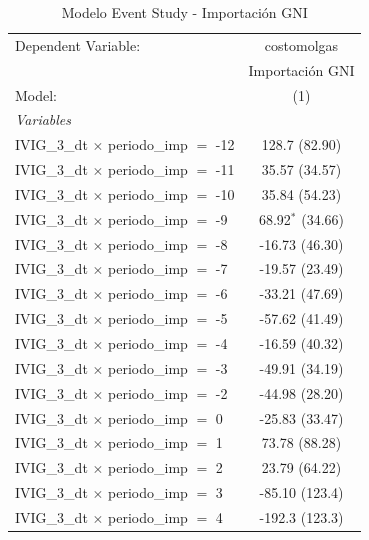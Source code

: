 \documentclass[12pt]{article}
\begin{document}
\setcounter{table}{7}
\begin{table}[htbp]
\centering
\begin{threeparttable}

   \caption{Modelo Event Study - Importación GNI}
   \centering
   \small
   \begin{tabular}{lc}
      \tabularnewline \midrule \midrule
      Dependent Variable:                           & costomolgas\\  
                                                    & Importación GNI \\   
      Model:                                        & (1)\\  
      \midrule
      \emph{Variables}\\
      IVIG\_3\_dt $\times$ periodo\_imp $=$ -12     & 128.7 (82.90)\\   
      IVIG\_3\_dt $\times$ periodo\_imp $=$ -11     & 35.57 (34.57)\\   
      IVIG\_3\_dt $\times$ periodo\_imp $=$ -10     & 35.84 (54.23)\\   
      IVIG\_3\_dt $\times$ periodo\_imp $=$ -9      & 68.92$^{*}$ (34.66)\\   
      IVIG\_3\_dt $\times$ periodo\_imp $=$ -8      & -16.73 (46.30)\\   
      IVIG\_3\_dt $\times$ periodo\_imp $=$ -7      & -19.57 (23.49)\\   
      IVIG\_3\_dt $\times$ periodo\_imp $=$ -6      & -33.21 (47.69)\\   
      IVIG\_3\_dt $\times$ periodo\_imp $=$ -5      & -57.62 (41.49)\\   
      IVIG\_3\_dt $\times$ periodo\_imp $=$ -4      & -16.59 (40.32)\\   
      IVIG\_3\_dt $\times$ periodo\_imp $=$ -3      & -49.91 (34.19)\\   
      IVIG\_3\_dt $\times$ periodo\_imp $=$ -2      & -44.98 (28.20)\\   
      IVIG\_3\_dt $\times$ periodo\_imp $=$ 0       & -25.83 (33.47)\\   
      IVIG\_3\_dt $\times$ periodo\_imp $=$ 1       & 73.78 (88.28)\\   
      IVIG\_3\_dt $\times$ periodo\_imp $=$ 2       & 23.79 (64.22)\\   
      IVIG\_3\_dt $\times$ periodo\_imp $=$ 3       & -85.10 (123.4)\\   
      IVIG\_3\_dt $\times$ periodo\_imp $=$ 4       & -192.3 (123.3)\\   

\end{tabular}
\end{threeparttable}
\end{table}
\end{document}
